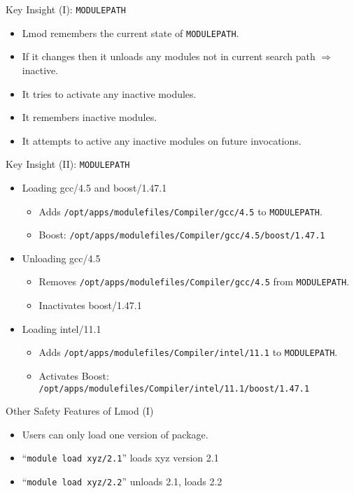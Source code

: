 \documentclass{beamer}
\begin{document}
\begin{frame}{Key Insight (I): \texttt{MODULEPATH}}
  \begin{itemize}
    \item Lmod remembers the current state of \texttt{MODULEPATH}.
    \item If it changes then it unloads any modules not in current
      search path $\Rightarrow$ inactive.
    \item It tries to activate any inactive modules.
    \item It remembers inactive modules.
    \item It attempts to active any inactive modules on future invocations.
  \end{itemize}
\end{frame}

\begin{frame}{Key Insight (II): \texttt{MODULEPATH}}
  \begin{itemize}
    \item Loading gcc/4.5 and boost/1.47.1
      \begin{itemize}
        \item Adds \texttt{/opt/apps/modulefiles/Compiler/gcc/4.5} to
          \texttt{MODULEPATH}.
        \item Boost: \texttt{/opt/apps/modulefiles/Compiler/gcc/4.5/boost/1.47.1}
      \end{itemize}
    \item Unloading gcc/4.5
      \begin{itemize}
        \item Removes \texttt{/opt/apps/modulefiles/Compiler/gcc/4.5}
          from \texttt{MODULEPATH}.
        \item Inactivates boost/1.47.1
      \end{itemize}
    \item Loading intel/11.1
      \begin{itemize}
        \item Adds \texttt{/opt/apps/modulefiles/Compiler/intel/11.1} to
          \texttt{MODULEPATH}.
        \item Activates Boost: \texttt{/opt/apps/modulefiles/Compiler/intel/11.1/boost/1.47.1}
      \end{itemize}
  \end{itemize}
\end{frame}

\begin{frame}{Other Safety Features of Lmod (I)}
  \begin{itemize}
    \item Users can only load one version of package.
    \item ``\texttt{module load xyz/2.1}'' loads xyz version 2.1
    \item ``\texttt{module load xyz/2.2}'' unloads 2.1, loads 2.2
  \end{itemize}
\end{frame}
\end{document}
